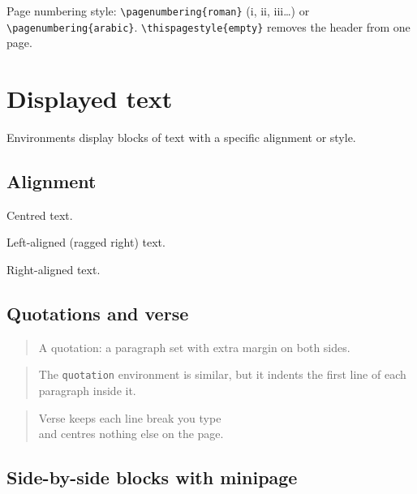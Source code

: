 \documentclass[11pt,a4paper]{article}
\begin{document}
Page numbering style: \verb|\pagenumbering{roman}| (i, ii, iii\ldots)
or \verb|\pagenumbering{arabic}|. \verb|\thispagestyle{empty}| removes
the header from one page.

\section{Displayed text}

Environments display blocks of text with a specific alignment or style.

\subsection{Alignment}

\begin{center}
Centred text.
\end{center}

\begin{flushleft}
Left-aligned (ragged right) text.
\end{flushleft}

\begin{flushright}
Right-aligned text.
\end{flushright}

\subsection{Quotations and verse}

\begin{quote}
A quotation: a paragraph set with extra margin on both sides.
\end{quote}

\begin{quotation}
The \texttt{quotation} environment is similar, but it indents the
first line of each paragraph inside it.
\end{quotation}

\begin{verse}
Verse keeps each line break you type\\
and centres nothing else on the page.
\end{verse}

\subsection{Side-by-side blocks with minipage}
\end{document}
